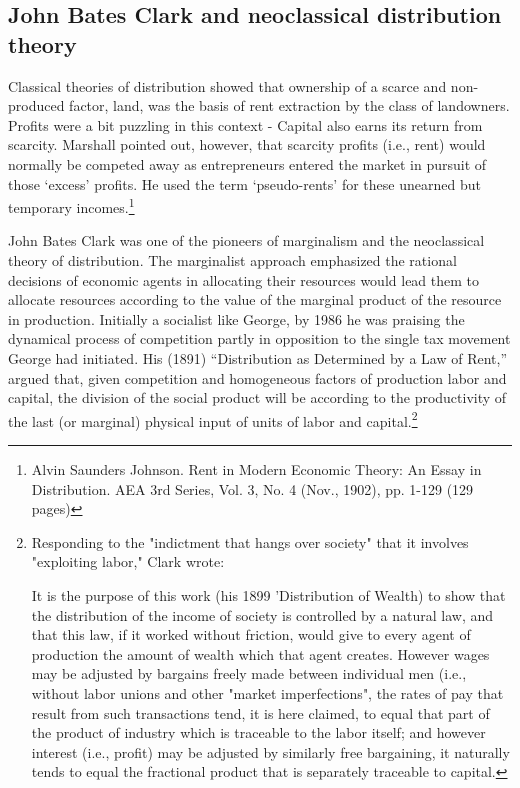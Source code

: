   \subsection{John Bates Clark and neoclassical distribution theory}
  Classical theories of distribution showed that ownership of a scarce and non-produced factor, land, was the  basis of rent extraction by the class of landowners. Profits were a bit puzzling in this context - Capital also earns its return from scarcity. Marshall pointed out, however, that scarcity profits (i.e., rent) would normally be competed away  as entrepreneurs entered the market in pursuit of those `excess' profits. He used the term `pseudo-rents' for these unearned but temporary incomes.\footnote{Alvin Saunders Johnson. Rent in Modern Economic Theory: An Essay in Distribution. AEA 3rd Series, Vol. 3, No. 4 (Nov., 1902), pp. 1-129 (129 pages)}

  
 John Bates Clark was one of the pioneers of marginalism and the neoclassical theory of  distribution.  The marginalist approach emphasized the rational decisions of economic agents in allocating their resources would lead them to allocate resources according to the value of the marginal product of the resource in production.  Initially a socialist like George, by 1986 he was praising the dynamical process of competition partly in opposition to the single tax movement George had initiated.  His (1891) ``Distribution as Determined by a Law of Rent,'' argued that, given  competition and homogeneous factors of production labor and capital, the division of the social product will be according to the productivity of the last (or marginal) physical input of units of labor and capital.\footnote{Responding to the "indictment that hangs over society" that it involves "exploiting labor," Clark wrote:

    It is the purpose of this work (his 1899 'Distribution of Wealth) to show that the distribution of the income of society is controlled by a natural law, and that this law, if it worked without friction, would give to every agent of production the amount of wealth which that agent creates. However wages may be adjusted by bargains freely made between individual men (i.e., without labor unions and other "market imperfections", the rates of pay that result from such transactions tend, it is here claimed, to equal that part of the product of industry which is traceable to the labor itself; and however interest (i.e., profit) may be adjusted by similarly free bargaining, it naturally tends to equal the fractional product that is separately traceable to capital.} 
 
